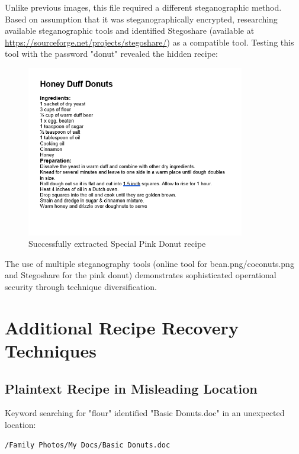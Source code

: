 Unlike previous images, this file required a different steganographic method. Based on assumption that it was steganographically encrypted, researching available steganographic tools and identified Stegoshare (available at \url{https://sourceforge.net/projects/stegoshare/}) as a compatible tool. Testing this tool with the password "donut" revealed the hidden recipe:

\begin{figure}[htbp]
    \centering
    \includegraphics[width=0.85\textwidth]{images/Artifact and Evidence Recovery/SpecialPinkDonut_extract.png}
    \caption{Successfully extracted Special Pink Donut recipe}
    \label{fig:pink_donut_extract}
\end{figure}

The use of multiple steganography tools (online tool for bean.png/coconuts.png and Stegoshare for the pink donut) demonstrates sophisticated operational security through technique diversification.

\section{Additional Recipe Recovery Techniques}

\subsection{Plaintext Recipe in Misleading Location}
Keyword searching for "flour" identified "Basic Donuts.doc" in an unexpected location:
\begin{verbatim}
/Family Photos/My Docs/Basic Donuts.doc
\end{verbatim}

